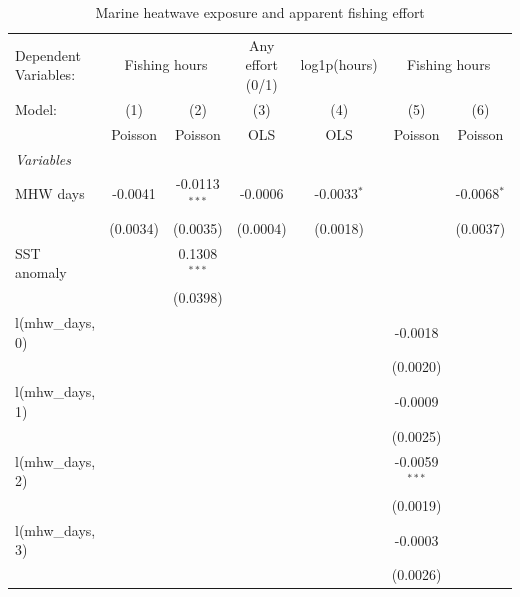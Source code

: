 
\begin{table}[htbp]
   \caption{\label{tab:main} Marine heatwave exposure and apparent fishing effort}
   \centering
   \begin{tabular}{lcccccc}
      \tabularnewline \midrule \midrule
      Dependent Variables: & \multicolumn{2}{c}{Fishing hours} & Any effort (0/1) & log1p(hours) & \multicolumn{2}{c}{Fishing hours}\\
      Model:               & (1)          & (2)             & (3)       & (4)           & (5)             & (6)\\  
                           &  Poisson     & Poisson         & OLS       & OLS           & Poisson         & Poisson\\  
      \midrule
      \emph{Variables}\\
      MHW days             & -0.0041      & -0.0113$^{***}$ & -0.0006   & -0.0033$^{*}$ &                 & -0.0068$^{*}$\\   
                           & (0.0034)     & (0.0035)        & (0.0004)  & (0.0018)      &                 & (0.0037)\\   
      SST anomaly          &              & 0.1308$^{***}$  &           &               &                 &   \\   
                           &              & (0.0398)        &           &               &                 &   \\   
      l(mhw\_days, 0)      &              &                 &           &               & -0.0018         &   \\   
                           &              &                 &           &               & (0.0020)        &   \\   
      l(mhw\_days, 1)      &              &                 &           &               & -0.0009         &   \\   
                           &              &                 &           &               & (0.0025)        &   \\   
      l(mhw\_days, 2)      &              &                 &           &               & -0.0059$^{***}$ &   \\   
                           &              &                 &           &               & (0.0019)        &   \\   
      l(mhw\_days, 3)      &              &                 &           &               & -0.0003         &   \\   
                           &              &                 &           &               & (0.0026)        &   \\   

\end{tabular}
\end{table}

